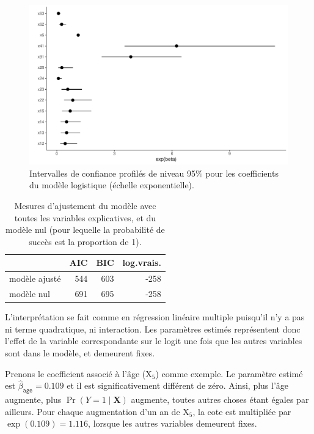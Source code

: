 \documentclass[
  11pt,
  letterpaper,
]{scrbook}
\theoremstyle{definition}
\theoremstyle{remark}
\begin{document}
\begin{figure}[ht!]

{\centering \includegraphics[width=1\textwidth,height=\textheight]{reglogistique_files/figure-pdf/fig-confint-modele2-logist-1.pdf}

}

\caption{\label{fig-confint-modele2-logist}Intervalles de confiance
profilés de niveau 95\% pour les coefficients du modèle logistique
(échelle exponentielle).}

\end{figure}

\hypertarget{tbl-gof-logist1}{}
\begin{table}
\caption{\label{tbl-gof-logist1}Mesures d'ajustement du modèle avec toutes les variables explicatives,
et du modèle nul (pour lequelle la probabilité de succès est la
proportion de 1). }\tabularnewline

\centering
\begin{tabular}{lrrr}
\toprule
  & AIC & BIC & log.vrais.\\
\midrule
modèle ajusté & 544 & 603 & -258\\
modèle nul & 691 & 695 & -258\\
\bottomrule
\end{tabular}
\end{table}

L'interprétation se fait comme en régression linéaire multiple puisqu'il
n'y a pas ni terme quadratique, ni interaction. Les paramètres estimés
représentent donc l'effet de la variable correspondante sur le logit une
fois que les autres variables sont dans le modèle, et demeurent fixes.

Prenons le coefficient associé à l'âge (\(\mathrm{X}_5\)) comme exemple.
Le paramètre estimé est \(\widehat{\beta}_{\texttt{age}}=0.109\) et il
est significativement différent de zéro. Ainsi, plus l'âge augmente,
plus \(\Pr(Y=1\mid \mathbf{X})\) augmente, toutes autres choses étant
égales par ailleurs. Pour chaque augmentation d'un an de
\(\mathrm{X}_5\), la cote est multipliée par \(\exp(0.109)=1.116\),
lorsque les autres variables demeurent fixes.
\end{document}
